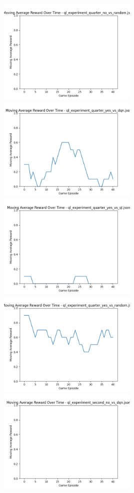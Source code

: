 \includegraphics[width=0.5\textwidth]{images/moving_average_reward_ql_experiment_quarter_no_vs_random.png} 
\includegraphics[width=0.5\textwidth]{images/moving_average_reward_ql_experiment_quarter_yes_vs_dqn.png} 
\includegraphics[width=0.5\textwidth]{images/moving_average_reward_ql_experiment_quarter_yes_vs_ql.png} 
\includegraphics[width=0.5\textwidth]{images/moving_average_reward_ql_experiment_quarter_yes_vs_random.png} 
\includegraphics[width=0.5\textwidth]{images/moving_average_reward_ql_experiment_second_no_vs_dqn.png} 
